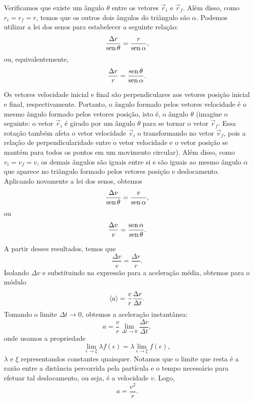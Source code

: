 Verificamos que existe um ângulo $\theta$ entre os vetores $\vec{r}_i$ e $\vec{r}_f$. Além disso, como $r_i = r_f = r$, temos que os outros dois ângulos do triângulo são $\alpha$. Podemos utilizar a lei dos senos para estabelecer a seguinte relação:
\begin{equation}
    \frac{\Delta r}{\operatorname{sen} \theta} = \frac{r}{\operatorname{sen} \alpha},
\end{equation}
%
ou, equivalentemente,
\begin{equation}
    \frac{\Delta r}{r} = \frac{\operatorname{sen} \theta}{\operatorname{sen} \alpha}.
\end{equation}

Os vetores velocidade inicial e final são perpendiculares aos vetores posição inicial e final, respectivamente. Portanto, o ângulo formado pelos vetores velocidade é o mesmo ângulo formado pelos vetores posição, isto é, o ângulo $\theta$ (imagine o seguinte: o vetor $\vec{r}_i$ é girado por um ângulo $\theta$ para se tornar o vetor $\vec{r}_f$. Essa rotação também afeta o vetor velocidade $\vec{v}_i$ o transformando no vetor $\vec{v}_f$, pois a relação de perpendicularidade entre o vetor velocidade e o vetor posição se mantém para todos os pontos em um movimento circular). Além disso, como $v_i = v_f = v$, os demais ângulos são iguais entre si e são iguais ao mesmo ângulo $\alpha$ que aparece no triângulo formado pelos vetores posição e deslocamento. Aplicando novamente a lei dos senos, obtemos
\begin{equation}
    \frac{\Delta v}{\operatorname{sen} \theta} = \frac{v}{\operatorname{sen} \alpha},
\end{equation}
%
ou
\begin{equation}
    \frac{\Delta v}{v} = \frac{\operatorname{sen}\alpha}{\operatorname{sen}\theta}.
\end{equation}

A partir desses resultados, temos que
\begin{equation}
    \frac{\Delta v}{v} = \frac{\Delta r}{r}.
\end{equation}
%
Isolando $\Delta v$ e substituindo na expressão para a aceleração média, obtemos para o módulo
\begin{equation}
  \left\langle{a}\right\rangle = \frac{v}{r} \frac{\Delta r}{\Delta t}.
\end{equation}
%
Tomando o limite $\Delta t \to 0$, obtemos a aceleração instantânea:
\begin{equation}
  a = \frac{v}{r} \lim_{\Delta t \to 0} \frac{\Delta r}{\Delta t},
\end{equation}
%
onde usamos a propriedade
\begin{equation}
    \lim_{\epsilon \to \xi} \lambda f(\epsilon) = \lambda \lim_{\epsilon\to \xi} f(\epsilon),
\end{equation}
%
$\lambda$ e $\xi$ representandos constantes quaisquer. Notamos que o limite que resta é a razão entre a distância percorrida pela partícula e o tempo necessário para efetuar tal deslocamento, ou seja, é a velocidade $v$. Logo,
\begin{equation}
  a = \frac{v^2}{r}.
\end{equation}

